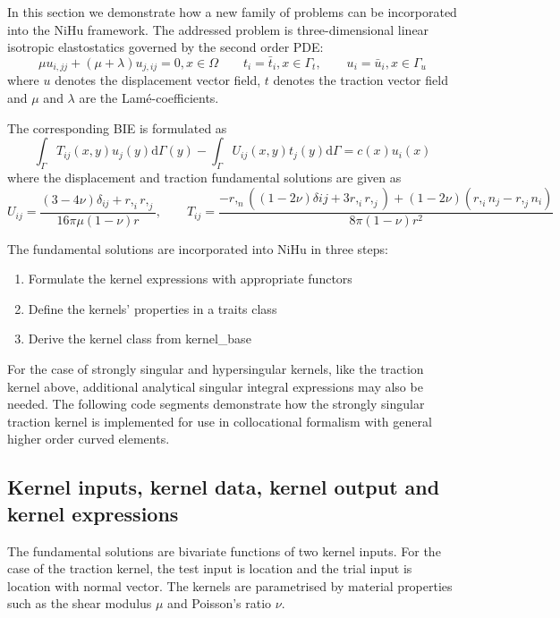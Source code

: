 \documentclass{article}
\newcommand{\td}{\mathrm{d}}
\begin{document}
In this section we demonstrate how a new family of problems can be incorporated into the NiHu framework.
The addressed problem is three-dimensional linear isotropic elastostatics governed by the second order PDE:
%
\begin{equation}
\mu u_{i,jj} + \left(\mu + \lambda\right) u_{j,ij} = 0, x \in \Omega
\qquad t_i = \bar{t}_i, x \in \Gamma_t,
\qquad u_i = \bar{u}_i, x \in \Gamma_u
\end{equation}
%
where $u$ denotes the displacement vector field, $t$ denotes the traction vector field and $\mu$ and $\lambda$ are the Lamé-coefficients.

The corresponding BIE is formulated as
%
\begin{equation}
\int_{\Gamma} T_{ij}(x,y) u_j(y) \td \Gamma(y) - \int_{\Gamma} U_{ij}(x,y) t_{j}(y) \td \Gamma = c(x) u_i(x)
\end{equation}
%
where the displacement and traction fundamental solutions are given as
%
\begin{equation}
U_{ij} = \frac{(3-4\nu) \delta_{ij} + r,_i r,_j}{16 \pi \mu (1-\nu) r}, \qquad
T_{ij} = \frac{-r,_n ((1-2\nu)\delta{ij} + 3 r,_i r,_j) + (1-2\nu) (r,_i n_j - r,_j n_i)}{8 \pi (1-\nu) r^2}
\end{equation}

The fundamental solutions are incorporated into NiHu in three steps:
\begin{enumerate}
	\item Formulate the kernel expressions with appropriate functors
	\item Define the kernels' properties in a traits class
	\item Derive the kernel class from kernel\_base
\end{enumerate}
%
For the case of strongly singular and hypersingular kernels, like the traction kernel above, additional analytical singular integral expressions may also be needed.
The following code segments demonstrate how the strongly singular traction kernel is implemented for use in collocational formalism with general higher order curved elements.

\subsection{Kernel inputs, kernel data, kernel output and kernel expressions}

The fundamental solutions are bivariate functions of two kernel inputs.
For the case of the traction kernel, the test input is location and the trial input is location with normal vector.
The kernels are parametrised by material properties such as the shear modulus $\mu$ and Poisson's ratio $\nu$.
\end{document}
